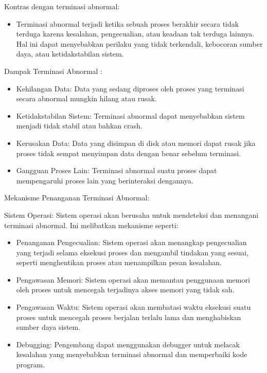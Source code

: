 \documentclass[12pt]{article}
\begin{document}
\begin{itemize}
        Kontras dengan terminasi abnormal:
        \begin{itemize}
            \item Terminasi abnormal terjadi ketika sebuah proses berakhir secara tidak terduga karena kesalahan, pengecualian, atau keadaan tak terduga lainnya. Hal ini dapat menyebabkan perilaku yang tidak terkendali, kebocoran sumber daya, atau ketidakstabilan sistem.
        \end{itemize}
    
    Dampak Terminasi Abnormal :
    \begin{itemize}
        \item Kehilangan Data: Data yang sedang diproses oleh proses yang terminasi secara abnormal mungkin hilang atau rusak.
        \item Ketidakstabilan Sistem: Terminasi abnormal dapat menyebabkan sistem menjadi tidak stabil atau bahkan crash.
        \item Kerusakan Data: Data yang disimpan di disk atau memori dapat rusak jika proses tidak sempat menyimpan data dengan benar sebelum terminasi.
        \item Gangguan Proses Lain: Terminasi abnormal suatu proses dapat mempengaruhi proses lain yang berinteraksi dengannya.
    \end{itemize}
    
    
    Mekanisme Penanganan Terminasi Abnormal:
    \begin{itemize}
        Sistem Operasi: Sistem operasi akan berusaha untuk mendeteksi dan menangani terminasi abnormal. Ini melibatkan mekanisme seperti:
    \end{itemize}
    
    
        \begin{itemize}
            \item Penanganan Pengecualian: Sistem operasi akan menangkap pengecualian yang terjadi selama eksekusi proses dan mengambil tindakan yang sesuai, seperti menghentikan proses atau menampilkan pesan kesalahan.
            \item Pengawasan Memori: Sistem operasi akan memantau penggunaan memori oleh proses untuk mencegah terjadinya akses memori yang tidak sah.
            \item Pengawasan Waktu: Sistem operasi akan membatasi waktu eksekusi suatu proses untuk mencegah proses berjalan terlalu lama dan menghabiskan sumber daya sistem.
            \item     Debugging: Pengembang dapat menggunakan debugger untuk melacak kesalahan yang menyebabkan terminasi abnormal dan memperbaiki kode program.
        \end{itemize}
    

\end{itemize}
\end{document}
